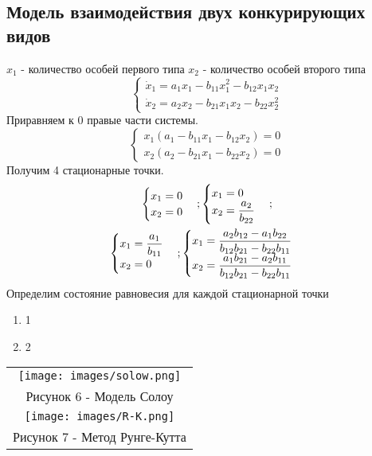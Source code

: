 \subsection{Модель взаимодействия двух конкурирующих видов}
$x_1$ - количество особей первого типа
$x_2$ - количество особей второго типа
\begin{equation}
  \begin{cases}
    \dot{x}_1=a_1x_1-b_{11}x_1^2-b_{12}x_1x_2\\
    \dot{x}_2=a_2x_2-b_{21}x_1x_2-b_{22}x_2^2
  \end{cases}
\end{equation}
Приравняем к 0 правые части системы.
\begin{equation}
  \begin{cases}
    x_1(a_1-b_{11}x_1-b_{12}x_2)=0\\
    x_2(a_2-b_{21}x_1-b_{22}x_2)=0
  \end{cases}
\end{equation}
Получим 4 стационарные точки.
\begin{gather}
  \begin{cases}
    x_1=0\\
    x_2=0
  \end{cases};
  \begin{cases}
    x_1=0\\
    x_2=\dfrac{a_2}{b_{22}}
  \end{cases};\\
  \begin{cases}
    x_1=\dfrac{a_1}{b_{11}}\\
    x_2=0
  \end{cases};
  \begin{cases}
    x_1=\dfrac{a_2b_{12}-a_1b_{22}}{b_{12}b_{21}-b_{22}b_{11}}\\
    x_2=\dfrac{a_1b_{21}-a_2b_{11}}{b_{12}b_{21}-b_{22}b_{11}}
  \end{cases}\notag
\end{gather}
Определим состояние равновесия для каждой стационарной точки
\begin{enumerate}
  \item 1
  \item 2
\end{enumerate}

\begin{center}
  \begin{tabular}{c}
    \texttt{[image: images/solow.png]}\\
    Рисунок 6 - Модель Солоу\\
    \texttt{[image: images/R-K.png]}\\
    Рисунок 7 - Метод Рунге-Кутта\\
  \end{tabular}
\end{center}

